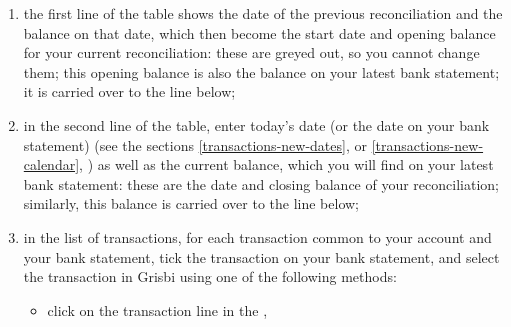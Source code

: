 \begin{enumerate}
	\item the first line of the table shows the date of the previous reconciliation and the balance on that date, which then become the start date and opening balance for your current reconciliation: these are greyed out, so you cannot change them; this opening balance is also the balance on your latest bank statement; it is carried over to the  line below;
	\item in the second line of the table, enter today’s date (or the date on your bank statement) (see the sections \vref{transactions-new-dates},  or \vref{transactions-new-calendar}, ) as well as the current balance, which you will find on your latest bank statement: these are the date and closing balance of your reconciliation; similarly, this balance is carried over to the  line below;
	\item in the list of transactions, for each transaction common to your account and your bank statement, tick the transaction on your bank statement, and select the transaction in Grisbi using one of the following methods:
	\begin{itemize}
		\item click on the transaction line in the  ,

\end{itemize}
\end{enumerate}
